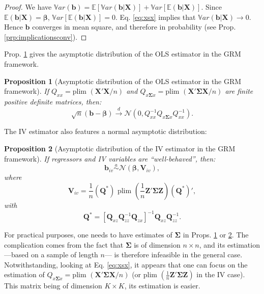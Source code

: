 \documentclass[
  12pt,
]{book}
\newtheorem{proposition}{Proposition}[chapter]
\theoremstyle{definition}
\theoremstyle{definition}
\theoremstyle{definition}
\theoremstyle{definition}
\theoremstyle{remark}
\begin{document}
\begin{proof}
We have \(\mathbb{V}ar(\mathbf{b})=\mathbb{E}[\mathbb{V}ar(\mathbf{b}|\mathbf{X})]+\mathbb{V}ar[\mathbb{E}(\mathbf{b}|\mathbf{X})]\). Since \(\mathbb{E}(\mathbf{b}|\mathbf{X})=\boldsymbol\beta\), \(\mathbb{V}ar[\mathbb{E}(\mathbf{b}|\mathbf{X})]=0\). Eq. \eqref{eq:xsx} implies that \(\mathbb{V}ar(\mathbf{b}|\mathbf{X}) \rightarrow 0\). Hence \(\mathbf{b}\) converges in mean square, and therefore in probability (see Prop. \ref{prp:implicationsconv}).
\end{proof}

Prop. \ref{prp:AsymptGRM} gives the asymptotic distribution of the OLS estimator in the GRM framework.

\begin{proposition}[Asymptotic distribution of the OLS estimator in the GRM framework]
\protect\hypertarget{prp:AsymptGRM}{}\label{prp:AsymptGRM}If \(Q_{xx}=\mbox{plim }(\mathbf{X}'\mathbf{X}/n)\) and \(Q_{x\boldsymbol\Sigma x}=\mbox{plim }(\mathbf{X}'\boldsymbol\Sigma\mathbf{X}/n)\) are finite positive definite matrices, then:
\[
\sqrt{n}(\mathbf{b}-\boldsymbol\beta) \overset{d}{\rightarrow} \mathcal{N}(0,Q_{xx}^{-1}Q_{x\boldsymbol\Sigma x}Q_{xx}^{-1}).
\]
\end{proposition}

The IV estimator also features a normal asymptotic distribution:

\begin{proposition}[Asymptotic distribution of the IV estimator in the GRM framework]
\protect\hypertarget{prp:AsymptIVGRM}{}\label{prp:AsymptIVGRM}If regressors and IV variables are ``well-behaved'', then:
\[
\mathbf{b}_{iv} \overset{a}{\sim} \mathcal{N}(\boldsymbol\beta,\mathbf{V}_{iv}),
\]
where
\[
\mathbf{V}_{iv} = \frac{1}{n}(\mathbf{Q}^*)\mbox{ plim }\left(\frac{1}{n} \mathbf{Z}'\boldsymbol\Sigma \mathbf{Z}\right)(\mathbf{Q}^*)',
\]
with
\[
\mathbf{Q}^* = [\mathbf{Q}_{xz}\mathbf{Q}_{zz}^{-1}\mathbf{Q}_{zx}]^{-1}\mathbf{Q}_{xz}\mathbf{Q}_{zz}^{-1}.
\]
\end{proposition}

For practical purposes, one needs to have estimates of \(\boldsymbol\Sigma\) in Props. \ref{prp:AsymptGRM} or \ref{prp:AsymptIVGRM}. The complication comes from the fact that \(\boldsymbol\Sigma\) is of dimension \(n \times n\), and its estimation ---based on a sample of length \(n\)--- is therefore infeasible in the general case. Notwithstanding, looking at Eq. \eqref{eq:xsx}, it appears that one can focus on the estimation of \(Q_{x\boldsymbol\Sigma x}=\mbox{plim }(\mathbf{X}'\boldsymbol\Sigma\mathbf{X}/n)\) (or \(\mbox{plim }\left(\frac{1}{n} \mathbf{Z}'\boldsymbol\Sigma \mathbf{Z}\right)\) in the IV case). This matrix being of dimension \(K \times K\), its estimation is easier.
\end{document}
